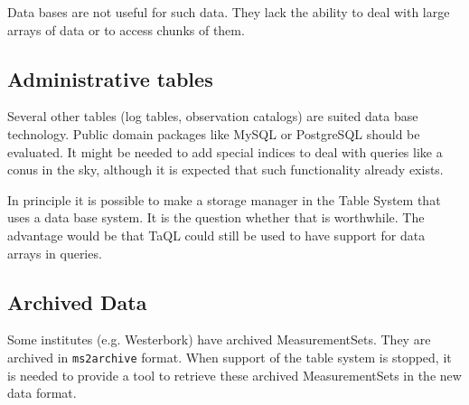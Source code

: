 Data bases are not useful for such data. They lack the ability to deal
with large arrays of data or to access chunks of them.

\subsection{Administrative tables}
Several other tables (log tables, observation catalogs) are suited
data base technology. Public domain packages like MySQL or PostgreSQL
should be evaluated. It might be needed to add special indices
to deal with queries like a conus in the sky, although it is expected
that such functionality already exists.

In principle it is possible to make a storage manager in the Table
System that uses a data base system. It is the question whether that
is worthwhile. The advantage would be that TaQL could still be
used to have support for data arrays in queries.

\subsection {Archived Data}
Some institutes (e.g. Westerbork) have archived MeasurementSets.
They are archived in \texttt{ms2archive} format. When support of the
table system is stopped, it is needed to provide a tool to retrieve
these archived MeasurementSets in the new data format.
